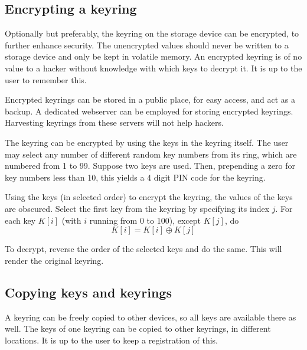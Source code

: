 \subsection{Encrypting a keyring}
Optionally but preferably,
the keyring on the storage device can be encrypted, to further enhance security.
The unencrypted values should never be written to a storage device and only be kept in volatile memory.
An encrypted keyring is of no value to a hacker without knowledge with which keys to decrypt it.
It is up to the user to remember this.
\par
Encrypted keyrings can be stored in a public place, for easy access, and act as a backup.
A dedicated webserver can be employed for storing encrypted keyrings.
Harvesting keyrings from these servers will not help hackers.
\par
The keyring can be encrypted by using the keys in the keyring itself.
The user may select any number of different random key numbers from its ring,
which are numbered from 1 to 99.
Suppose two keys are used.
Then,
prepending a zero for key numbers less than 10,
this yields a 4 digit PIN code for the keyring.
\par
Using the keys (in selected order) to encrypt the keyring, the values of the keys are obscured.
Select the first key from the keyring by specifying its index $j$.
For each key $K[i]$ (with $i$ running from 0 to 100), except $K[j]$, do
\[K[i]=K[i]\oplus K[j]\]
\par
To decrypt, reverse the order of the selected keys and do the same.
This will render the original keyring.

\subsection{Copying keys and keyrings}
A keyring can be freely copied to other devices, so all keys are available there as well.
The keys of one keyring can be copied to other keyrings, in different locations.
It is up to the user to keep a registration of this.
